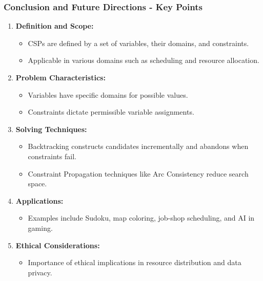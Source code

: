 \documentclass[aspectratio=169]{beamer}
\begin{document}
\begin{frame}[fragile]
    \frametitle{Conclusion and Future Directions - Key Points}
    
    \begin{enumerate}
        \item \textbf{Definition and Scope:} 
            \begin{itemize}
                \item CSPs are defined by a set of variables, their domains, and constraints.
                \item Applicable in various domains such as scheduling and resource allocation.
            \end{itemize}
        
        \item \textbf{Problem Characteristics:}
            \begin{itemize}
                \item Variables have specific domains for possible values.
                \item Constraints dictate permissible variable assignments.
            \end{itemize}
        
        \item \textbf{Solving Techniques:}
            \begin{itemize}
                \item Backtracking constructs candidates incrementally and abandons when constraints fail.
                \item Constraint Propagation techniques like Arc Consistency reduce search space.
            \end{itemize}
        
        \item \textbf{Applications:}
            \begin{itemize}
                \item Examples include Sudoku, map coloring, job-shop scheduling, and AI in gaming.
            \end{itemize}
        
        \item \textbf{Ethical Considerations:}
            \begin{itemize}
                \item Importance of ethical implications in resource distribution and data privacy.
            \end{itemize}
    \end{enumerate}    
\end{frame}
\end{document}
